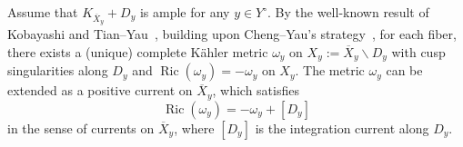 \documentclass[a4paper, 11pt]{amsart}
\theoremstyle{plain}
\numberwithin{equation}{section} %
\numberwithin{figure}{section} %
\theoremstyle{plain}
\theoremstyle{plain}
\theoremstyle{plain}
\theoremstyle{plain}
\theoremstyle{remark}
\theoremstyle{definition}
\theoremstyle{definition}
\DeclareMathOperator \Ric {\textrm{Ric}}
\begin{document}


Assume that $K_{\overline{X}_y}+D_y$ is ample for any $y\in Y^\circ$. By the well-known result of Kobayashi \cite{Kobayashi84-KE-open} and Tian--Yau~\cite{TianYau87-KE-complete}, building upon Cheng--Yau’s strategy~\cite{ChengYau80-complete}, for each fiber, there exists a (unique) complete K\"ahler metric $\omega_y$ on $X_y:= \overline{X}_y\backslash D_{y}$ with cusp singularities along $D_{y}$ and $\Ric(\omega_y)=-\omega_y$ on $X_y$.  The metric $\omega_y$ can be extended as a positive current on $\overline{X}_y$, which satisfies \begin{equation}\label{eq: KE-cusp1}
    \Ric(\omega_y)=-\omega_y+[D_{y}]
\end{equation} in the sense of currents on $\overline{X}_y$, where $[D_y]$ is the integration current along $D_y$. 
\end{document}

